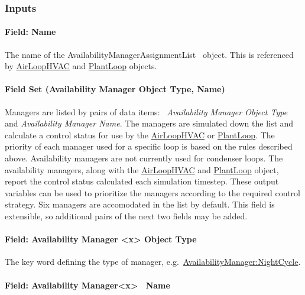 \subsubsection{Inputs}\label{inputs-2-002}

\paragraph{Field: Name}\label{field-name-2-001}

The name of the AvailabilityManagerAssignmentList ~object. This is referenced by \hyperref[airloophvac]{AirLoopHVAC} and \hyperref[plantloop]{PlantLoop} objects.

\paragraph{Field Set (Availability Manager Object Type, Name)}\label{field-set-availability-manager-object-type-name}

Managers are listed by pairs of data items:~ \emph{Availability Manager Object Type} and \emph{Availability Manager Name}. The managers are simulated down the list and calculate a control status for use by the \hyperref[airloophvac]{AirLoopHVAC} or \hyperref[plantloop]{PlantLoop}. The priority of each manager used for a specific loop is based on the rules described above. Availability managers are not currently used for condenser loops. The availability managers, along with the \hyperref[airloophvac]{AirLoopHVAC} and \hyperref[plantloop]{PlantLoop} object, report the control status calculated each simulation timestep. These output variables can be used to prioritize the managers according to the required control strategy. Six managers are accomodated in the list by default.  This field is extensible, so additional pairs of the next two fields may be added.

\paragraph{Field: Availability Manager \textless{}x\textgreater{} Object Type}\label{field-availability-manager-x-object-type}

The key word defining the type of manager, e.g.~\hyperref[availabilitymanagernightcycle]{AvailabilityManager:NightCycle}.

\paragraph{Field: Availability Manager\textless{}x\textgreater{}~ Name}\label{field-availability-managerx-name}

